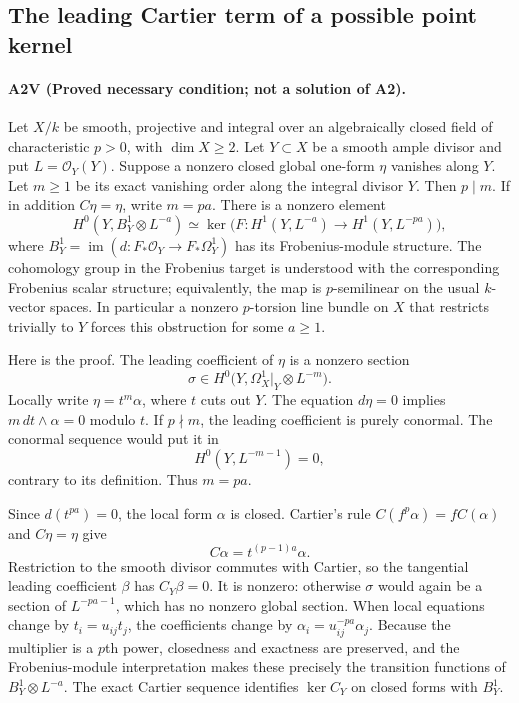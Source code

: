 \subsection{The leading Cartier term of a possible point kernel}
\paragraph{A2V (Proved necessary condition; not a solution of A2).}
Let $X/k$ be smooth, projective and integral over an algebraically
closed field of characteristic $p>0$, with $\dim X\geq2$.
Let $Y\subset X$ be a smooth ample divisor and put
$L=\mathcal O_Y(Y)$. Suppose a nonzero closed global one-form
$\eta$ vanishes along $Y$. Let $m\geq1$ be its exact vanishing
order along the integral divisor $Y$. Then $p\mid m$.
If in addition $C\eta=\eta$, write $m=pa$. There is a nonzero
element
\[
 H^0(Y,B_Y^1\otimes L^{-a})
  \simeq
 \ker\bigl(F:H^1(Y,L^{-a})\longrightarrow
                   H^1(Y,L^{-pa})\bigr),                 \tag{A2V.1}
\]
where $B_Y^1=\operatorname{im}(d:F_*\mathcal O_Y\to
F_*\Omega_Y^1)$ has its Frobenius-module structure.
The cohomology group in the Frobenius target is understood
with the corresponding Frobenius scalar structure; equivalently,
the map is $p$-semilinear on the usual $k$-vector spaces.
In particular a nonzero $p$-torsion line bundle on $X$ that
restricts trivially to $Y$ forces this obstruction for some $a\geq1$.

Here is the proof. The leading coefficient of $\eta$
is a nonzero section
\[
 \sigma\in H^0\bigl(Y,\Omega_X^1|_Y\otimes L^{-m}\bigr).
\]
Locally write $\eta=t^m\alpha$, where $t$ cuts out $Y$.
The equation $d\eta=0$ implies
$m\,dt\wedge\alpha=0$ modulo $t$. If $p\nmid m$, the
leading coefficient is purely conormal. The conormal sequence
would put it in
\[
 H^0(Y,L^{-m-1})=0,
\]
contrary to its definition. Thus $m=pa$.

Since $d(t^{pa})=0$, the local form $\alpha$ is closed.
Cartier's rule $C(f^p\alpha)=fC(\alpha)$ and $C\eta=\eta$
give
\[
 C\alpha=t^{(p-1)a}\alpha.
\]
Restriction to the smooth divisor commutes with Cartier, so
the tangential leading coefficient $\beta$ has $C_Y\beta=0$.
It is nonzero: otherwise $\sigma$ would again be a section of
$L^{-pa-1}$, which has no nonzero global section. When local
equations change by $t_i=u_{ij}t_j$, the coefficients change
by $\alpha_i=u_{ij}^{-pa}\alpha_j$. Because the multiplier is
a $p$th power, closedness and exactness are preserved, and the
Frobenius-module interpretation makes these precisely the
transition functions of $B_Y^1\otimes L^{-a}$. The exact
Cartier sequence identifies $\ker C_Y$ on closed forms with
$B_Y^1$.

